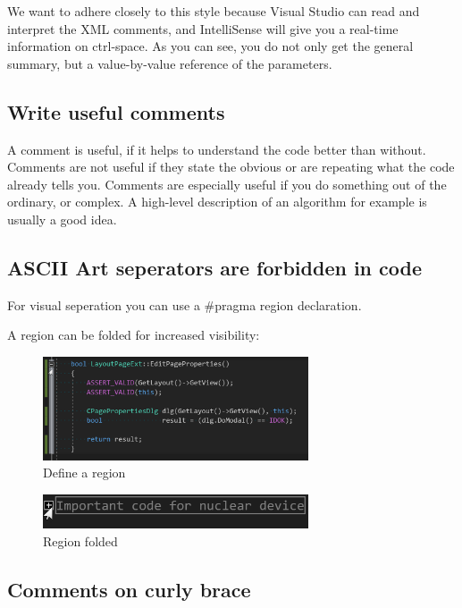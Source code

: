 \documentclass[11pt,a4paper]{article}
\begin{document}
We want to adhere closely to this style because Visual Studio can read and interpret the XML comments, and IntelliSense will give you a real-time information on ctrl-space. As you can see, you do not only get the general summary, but a value-by-value reference of the parameters.

\subsection{Write useful comments}

A comment is useful, if it helps to understand the code better than without. Comments are not useful if they state the obvious or are repeating what the code already tells you.
Comments are especially useful if you do something out of the ordinary, or complex. A high-level description of an algorithm for example is usually a good idea.

\subsection{ASCII Art seperators are forbidden in code}

For visual seperation you can use a \#pragma region declaration.

A region can be folded for increased visibility:

\begin{figure}[ht]
  \centering
  \includegraphics[width=0.7\textwidth]{pragma-region-open.png}
  \caption{Define a region}
\end{figure}

\begin{figure}[ht]
  \centering
  \includegraphics[width=0.7\textwidth]{pragma-region-closed.png}
  \caption{Region folded}
\end{figure}
    
\subsection{Comments on curly brace}
\end{document}
